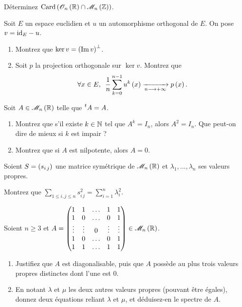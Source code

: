 \begin{exoss}
Déterminez \(\Card\paren{\Orth{n}[\R]\inter\M{n}[\Z]}\).
\end{exoss}

\begin{exoss}
Soit \(E\) un espace euclidien et \(u\) un automorphisme orthogonal de \(E\). On pose \(v=\mathrm{id}_{E}-u\).

\begin{enumerate}
    \item Montrez que \(\ker v=\left(\operatorname{Im} v\right)^{\perp}\). \\
    \item Soit \(p\) la projection orthogonale sur \(\ker v\). Montrez que \[\quantifs{\forall x\in E}\dfrac{1}{n}\sum_{k=0}^{n-1}u^k\paren{x}\tendqd{n\to\pinf}p\paren{x}.\]
\end{enumerate}
\end{exoss}

\begin{exos}
Soit \(A\in\M{n}[\R]\) telle que \(\prescript{t}{}{A}=A\).

\begin{enumerate}
    \item Montrez que s'il existe \(k\in\mathbb{N}\) tel que \(A^k=I_n\), alors \(A^2=I_n\). Que peut-on dire de mieux si \(k\) est impair ? \\
    \item Montrez que si \(A\) est nilpotente, alors \(A=0\).
\end{enumerate}
\end{exos}

\begin{exos}
Soient \(S=\left(s_{i\,j}\right)\) une matrice symétrique de \(\M{n}[\R]\) et \(\lambda_1,\dots,\lambda_n\) ses valeurs propres.

Montrez que \(\sum_{1\leq i,j\leq n}s_{i\,j}^2=\sum_{i=1}^n\lambda_i^2\).
\end{exos}

\begin{exoss}
Soient \(n\geq3\) et \(A=\begin{pmatrix}
1 & 1 & \dots & 1 & 1 \\
1 & 0 & \dots & 0 & 1 \\
\vdots & \vdots & 0 & \vdots & \vdots \\
1 & 0 & \dots & 0 & 1 \\
1 & 1 & \dots & 1 & 1
\end{pmatrix}\in\M{n}[\R]\).

\begin{enumerate}
    \item Justifiez que \(A\) est diagonalisable, puis que \(A\) possède au plus trois valeurs propres distinctes dont l'une est \(0\). \\
    \item En notant \(\lambda\) et \(\mu\) les deux autres valeurs propres (pouvant être égales), donnez deux équations reliant \(\lambda\) et \(\mu\), et déduisez-en le spectre de \(A\).
\end{enumerate}
\end{exoss}

